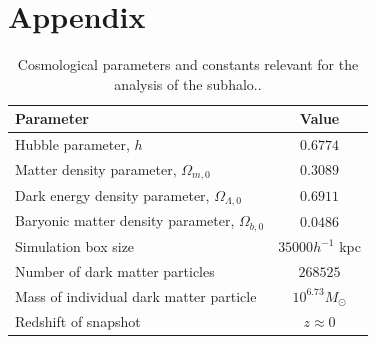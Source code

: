 \chapter{Appendix}
\begin{table}[h]
    \centering
    \begin{tabular}{|l|c|}
        \hline
        Parameter & Value \\
        \hline
        Hubble parameter, $h$ & $0.6774$ \\
        Matter density parameter, $\Omega_{m,0}$ & $0.3089$ \\
        Dark energy density parameter, $\Omega_{\Lambda,0}$ & $0.6911$ \\
        Baryonic matter density parameter, $\Omega_{b,0}$ & $0.0486$ \\
        Simulation box size & $35000 h^{-1}$ kpc \\
        Number of dark matter particles & $268525$ \\
        Mass of individual dark matter particle & $10^{6.73} M_\odot$ \\
        Redshift of snapshot & $z \approx 0$ \\
        \hline
    \end{tabular}
    \caption{Cosmological parameters and constants relevant for the analysis of the subhalo..}
    \label{tab:cosmological_parameters}
\end{table}